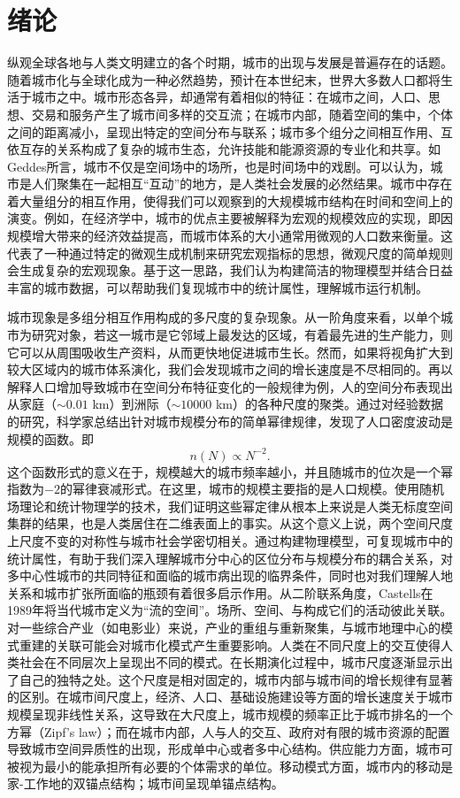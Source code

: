 \chapter{绪论}

纵观全球各地与人类文明建立的各个时期，城市的出现与发展是普遍存在的话题。随着城市化与全球化成为一种必然趋势，预计在本世纪末，世界大多数人口都将生活于城市之中\cite{batty2013}。城市形态各异，却通常有着相似的特征：在城市之间，人口、思想、交易和服务产生了城市间多样的交互流；在城市内部，随着空间的集中，个体之间的距离减小，呈现出特定的空间分布与联系；城市多个组分之间相互作用、互依互存的关系构成了复杂的城市生态，允许技能和能源资源的专业化和共享。如Geddes所言，城市不仅是空间场中的场所，也是时间场中的戏剧\cite{geddes1904}。可以认为，城市是人们聚集在一起相互“互动”的地方，是人类社会发展的必然结果。城市中存在着大量组分的相互作用，使得我们可以观察到的大规模城市结构在时间和空间上的演变\cite{Barthelemy2019}。例如，在经济学中，城市的优点主要被解释为宏观的规模效应的实现，即因规模增大带来的经济效益提高，而城市体系的大小通常用微观的人口数来衡量。这代表了一种通过特定的微观生成机制来研究宏观指标的思想，微观尺度的简单规则会生成复杂的宏观现象。基于这一思路，我们认为构建简洁的物理模型并结合日益丰富的城市数据，可以帮助我们复现城市中的统计属性，理解城市运行机制。

城市现象是多组分相互作用构成的多尺度的复杂现象。从一阶角度来看，以单个城市为研究对象，若这一城市是它邻域上最发达的区域，有着最先进的生产能力，则它可以从周围吸收生产资料，从而更快地促进城市生长\cite{Arbesman2009}。然而，如果将视角扩大到较大区域内的城市体系演化，我们会发现城市之间的增长速度是不尽相同的\cite{BerryThe}。再以解释人口增加导致城市在空间分布特征变化的一般规律为例，人的空间分布表现出从家庭（$\sim 0.01$ km）到洲际（$\sim 10000$ km）的各种尺度的聚类。通过对经验数据的研究，科学家总结出针对城市规模分布的简单幂律规律，发现了人口密度波动是规模的函数。即\[n(N) \propto N^{−2}.\]这个函数形式的意义在于，规模越大的城市频率越小，并且随城市的位次是一个幂指数为$-2$的幂律衰减形式。在这里，城市的规模主要指的是人口规模。使用随机场理论和统计物理学的技术，我们证明这些幂定律从根本上来说是人类无标度空间集群的结果，也是人类居住在二维表面上的事实。从这个意义上说，两个空间尺度上尺度不变的对称性与城市社会学密切相关。通过构建物理模型，可复现城市中的统计属性，有助于我们深入理解城市分中心的区位分布与规模分布的耦合关系，对多中心性城市的共同特征和面临的城市病出现的临界条件，同时也对我们理解人地关系和城市扩张所面临的瓶颈有着很多启示作用。从二阶联系角度，Castells在1989年将当代城市定义为“流的空间”\cite{castells1989}。场所、空间、与构成它们的活动彼此关联\cite{BerryThe}。对一些综合产业（如电影业）来说，产业的重组与重新聚集，与城市地理中心的模式重建的关联可能会对城市化模式产生重要影响\cite{doi:10.1068/d040305}。人类在不同尺度上的交互使得人类社会在不同层次上呈现出不同的模式。在长期演化过程中，城市尺度逐渐显示出了自己的独特之处。这个尺度是相对固定的，城市内部与城市间的增长规律有显著的区别。在城市间尺度上，经济、人口、基础设施建设等方面的增长速度关于城市规模呈现非线性关系，这导致在大尺度上，城市规模的频率正比于城市排名的一个方幂（Zipf's law）\cite{zipf1949}；而在城市内部，人与人的交互、政府对有限的城市资源的配置导致城市空间异质性的出现，形成单中心或者多中心结构。供应能力方面，城市可被视为最小的能承担所有必要的个体需求的单位。移动模式方面，城市内的移动是家-工作地的双锚点结构；城市间呈现单锚点结构。


